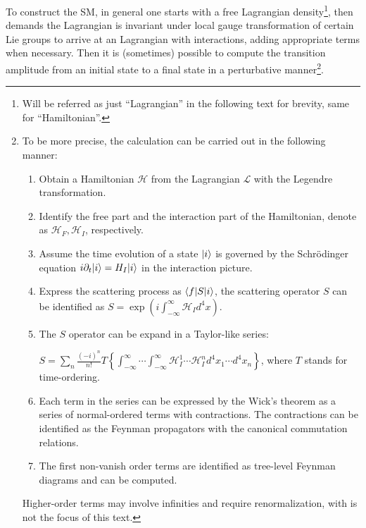 To construct the SM,
in general one starts with a free Lagrangian density\footnote{
    Will be referred as just ``Lagrangian'' in the following text for brevity,
    same for ``Hamiltonian''.
},
then demands the Lagrangian is invariant under local gauge transformation of
certain Lie groups to arrive at an Lagrangian with interactions,
adding appropriate terms when necessary.
Then it is (sometimes) possible to compute the transition amplitude from an
initial state to a final state in a perturbative manner\footnote{
    To be more precise, the calculation can be carried out in the following
    manner:
    \begin{enumerate}
        \item Obtain a Hamiltonian $\mathcal{H}$ from the Lagrangian
            $\mathcal{L}$ with the Legendre transformation.
        \item Identify the free part and the interaction part of the Hamiltonian,
            denote as $\mathcal{H}_F, \mathcal{H}_I$, respectively.
        \item Assume the time evolution of a state $\lvert i\rangle$ is governed by the
            Schrödinger equation $i \partial_t \lvert i\rangle = H_I \lvert i\rangle$
            in the interaction picture.
        \item Express the scattering process as $\langle f\rvert S \lvert i\rangle$,
            the scattering operator $S$ can be identified as
            $S = \exp({i \int_{-\infty}^\infty \mathcal{H}_I d^4 x})$.
        \item The $S$ operator can be expand in a Taylor-like series:

            $S = \sum_n \frac{(-i)^n}{n!} T\left\{
                \int_{-\infty}^{\infty} \cdots \int_{-\infty}^{\infty}
                \mathcal{H}_{I}^1 \cdots \mathcal{H}_{I}^n d^4 x_1 \cdots d^4 x_n
            \right\}$,
            where $T$ stands for time-ordering.
        \item Each term in the series can be expressed by the Wick's theorem
            as a series of normal-ordered terms with contractions.
            The contractions can be identified as the Feynman propagators with
            the canonical commutation relations.
        \item The first non-vanish order terms are identified as tree-level
            Feynman diagrams and can be computed.
    \end{enumerate}
    Higher-order terms may involve infinities and require renormalization,
    with is not the focus of this text.
}.

